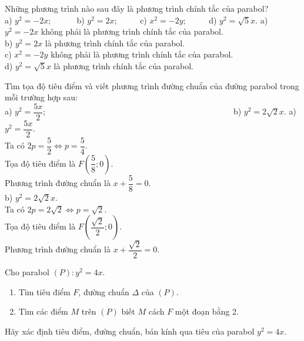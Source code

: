 \begin{bt}%
	Những phương trình nào sau đây là phương trình chính tắc của parabol?\\	
	a) $y^2=-2x$; ~~~~~
	b) $y^2=2x$;~~~~~
	c) $x^2=-2y$;~~~~~
	d) $y^2=\sqrt{5}x$.
	\loigiai 
	{
		a) $y^2=-2x$ không phải là phương trình chính tắc của parabol.\\
		b) $y^2=2x$ là phương trình chính tắc của parabol.\\
		c) $x^2=-2y$ không phải là phương trình chính tắc của parabol.\\
		d) $y^2=\sqrt{5}x$ là phương trình chính tắc của parabol.
	}
\end{bt}

\begin{bt}%
	Tìm tọa độ tiêu điểm và viết phương trình đường chuẩn của đường parabol trong mỗi trường hợp sau:\\
	a) $y^2=\dfrac{5x}{2}$;~~~~~~~~~~~~~~~~~~~~~~~~~~~~~~~~~~~~~~~~~~~~~
	b) $y^2=2\sqrt{2}x$.
	\loigiai 
	{
		a) $y^2=\dfrac{5x}{2}$.\\
		Ta có $2p=\dfrac{5}{2}\Leftrightarrow p=\dfrac{5}{4}$.\\
		Tọa độ tiêu điểm là $F\left( \dfrac{5}{8};0\right)$.\\
		Phương trình đường chuẩn là $x+\dfrac{5}{8}=0$.\\
		b) $y^2=2\sqrt{2}x$.\\
		Ta có $2p=2\sqrt{2}\Leftrightarrow p=\sqrt{2}$.\\
		Tọa độ tiêu điểm là $F\left( \dfrac{\sqrt{2}}{2};0\right)$.\\
		Phương trình đường chuẩn là $x+\dfrac{\sqrt{2}}{2}=0$.	
	}
\end{bt}

\begin{bt}%
	Cho parabol $ (P):y^2=4x $.
	\begin{enumerate}
		\item Tìm tiêu điểm $ F$, đường chuẩn $ \Delta $ của $ (P) $.
		\item Tìm các điểm $ M $ trên $ (P) $ biết $ M $ cách $ F $ một đoạn bằng 2.
	\end{enumerate}
\end{bt}

\begin{bt}%
	Hãy xác định tiêu điểm, đường chuẩn, bán kính qua tiêu của parabol $ y^2=4x $.
\end{bt}

